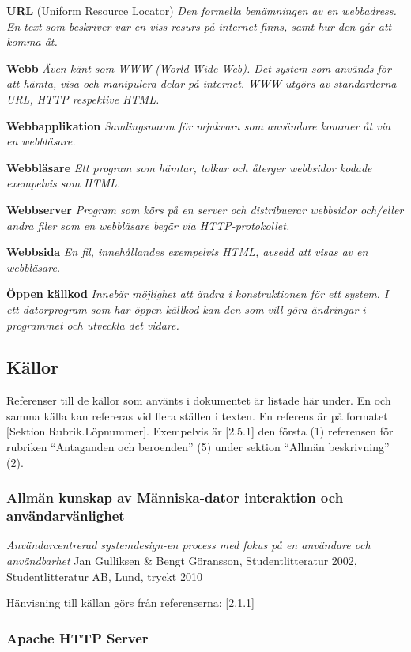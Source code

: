 \documentclass[a4paper, twoside, 11pt, titlepage]{article}
\begin{document}
	\textbf{URL} (Uniform Resource Locator) \emph{Den formella benämningen av en webbadress. En text som beskriver var en viss resurs på internet finns, samt hur den går att komma åt.}

	\textbf{Webb} \emph{Även känt som WWW (World Wide Web). Det system som används för att hämta, visa och manipulera delar på internet. WWW utgörs av standarderna URL, HTTP respektive HTML.}

	\textbf{Webbapplikation} \emph{Samlingsnamn för mjukvara som användare kommer åt via en webbläsare.}

	\textbf{Webbläsare} \emph{Ett program som hämtar, tolkar och återger webbsidor kodade exempelvis som HTML.}

	\textbf{Webbserver} \emph{Program som körs på en server och distribuerar webbsidor och/eller andra filer som en webbläsare begär via HTTP-protokollet.}

	\textbf{Webbsida} \emph{En fil, innehållandes exempelvis HTML, avsedd att visas av en webbläsare.}

	\textbf{Öppen källkod} \emph{Innebär möjlighet att ändra i konstruktionen för ett system. I ett datorprogram som har öppen källkod kan den som vill göra ändringar i programmet och utveckla det vidare.}

	\subsection{Källor}


	Referenser till de källor som använts i dokumentet är listade här under. En och samma källa kan refereras vid flera ställen i texten. En referens är på formatet [Sektion.Rubrik.Löpnummer]. Exempelvis är [2.5.1] den första (1) referensen för rubriken ``Antaganden och beroenden'' (5) under sektion ``Allmän beskrivning'' (2).

		\subsubsection{Allmän kunskap av Människa-dator interaktion och användarvänlighet}


		\emph{Användarcentrerad systemdesign-en process med fokus på en användare och användbarhet} Jan Gulliksen \& Bengt Göransson, Studentlitteratur 2002, Studentlitteratur AB, Lund, tryckt 2010

		Hänvisning till källan görs från referenserna: [2.1.1]

		\subsubsection{Apache HTTP Server}
\end{document}
